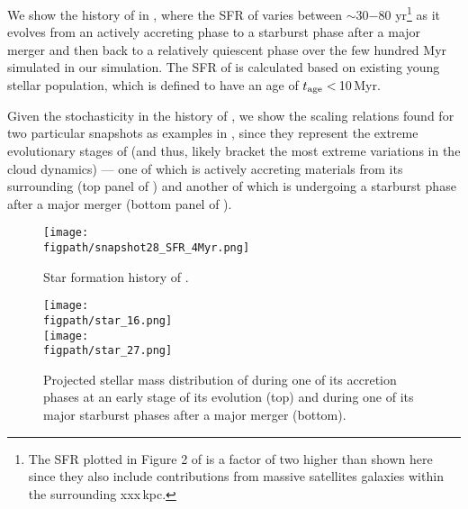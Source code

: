\documentclass[apj]{emulateapj} %
\begin{document}
We show the \SF history of \flower in , where 
the SFR of \flower varies between $\sim$30$-$80\,\Msun\,yr\pmOne\footnote{
The SFR plotted in Figure 2 of \citet{Pallottini17b}
is a factor of two higher than shown here since they also include contributions from 
massive satellites galaxies within the surrounding xxx\,kpc.}
as it evolves from an actively accreting phase to 
a starburst phase after a major merger and then back to a relatively quiescent phase
over the few hundred Myr simulated in our simulation.
The SFR of \flower is calculated based on existing young stellar population, which is 
defined to have an age of $t_{\rm age}<$\,10\,Myr.

Given the stochasticity in the \SF history of \flower, 
we show the scaling relations found for two particular snapshots as examples in ,
since they represent the extreme evolutionary stages of \flower (and thus, likely bracket the
most extreme variations in the cloud dynamics) --- one of which \flower is 
actively accreting materials from its surrounding (top panel of ) 
and another of which \flower is undergoing 
a starburst phase after a major merger (bottom panel of ). 



\begin{figure*}[htbp]
\centering
\texttt{[image: \\figpath/snapshot28\_SFR\_4Myr.png]}  
\caption{
Star formation history of \flower.
\label{fig:SFH}}
\end{figure*}


\begin{figure}[htbp]
\centering
\texttt{[image: \\figpath/star\_16.png]}  
\\ [-5em]
\texttt{[image: \\figpath/star\_27.png]}  
\caption{
Projected stellar mass distribution of \flower during one of its accretion phases 
at an early stage of its evolution (top) and during one of its major starburst phases 
after a major merger (bottom).
\label{fig:phases}}
\end{figure}
\end{document}
